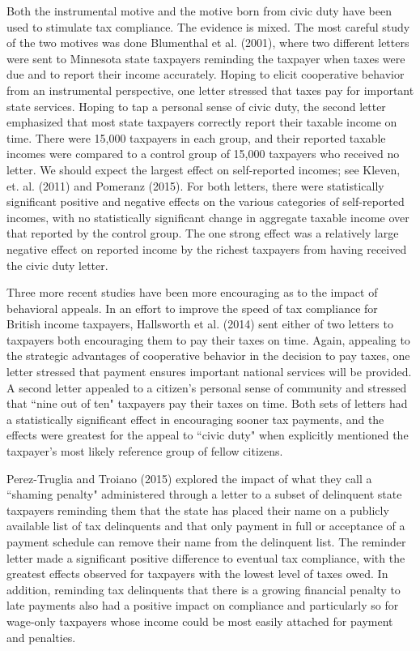 \documentclass[12pt,titlepage]{article}
\begin{document}
Both the instrumental motive and the motive born from civic duty have
been used to stimulate tax compliance.  The evidence is mixed.  The
most careful study of the two motives was done Blumenthal et
al. (2001), where two different letters were sent to Minnesota state
taxpayers reminding the taxpayer when taxes were due and to report
their income accurately.  Hoping to elicit cooperative behavior from
an instrumental perspective, one letter stressed that taxes pay for
important state services.  Hoping to tap a personal sense of civic
duty, the second letter emphasized that most state taxpayers correctly
report their taxable income on time.  There were 15,000 taxpayers in
each group, and their reported taxable incomes were compared to a
control group of 15,000 taxpayers who received no letter.  We should
expect the largest effect on self-reported incomes; see Kleven,
et. al. (2011) and Pomeranz (2015).  For both letters, there were
statistically significant positive and negative effects on the various
categories of self-reported incomes, with no statistically significant
change in aggregate taxable income over that reported by the control
group.  The one strong effect was a relatively large negative effect
on reported income by the richest taxpayers from having received the
civic duty letter.

Three more recent studies have been more encouraging as to the impact
of behavioral appeals. In an effort to improve the speed of tax
compliance for British income taxpayers, Hallsworth et al. (2014) sent
either of two letters to taxpayers both encouraging them to pay their
taxes on time.  Again, appealing to the strategic advantages of
cooperative behavior in the decision to pay taxes, one letter stressed
that payment ensures important national services will be provided.  A
second letter appealed to a citizen's personal sense of community and
stressed that ``nine out of ten" taxpayers pay their taxes on time.
Both sets of letters had a statistically significant effect in
encouraging sooner tax payments, and the effects were greatest for the
appeal to ``civic duty" when explicitly mentioned the taxpayer's most
likely reference group of fellow citizens.

Perez-Truglia and Troiano (2015) explored the impact of what they call
a ``shaming penalty" administered through a letter to a subset of
delinquent state taxpayers reminding them that the state has placed
their name on a publicly available list of tax delinquents and that
only payment in full or acceptance of a payment schedule can remove
their name from the delinquent list.  The reminder letter made a
significant positive difference to eventual tax compliance, with the
greatest effects observed for taxpayers with the lowest level of taxes
owed.  In addition, reminding tax delinquents that there is a growing
financial penalty to late payments also had a positive impact on
compliance and particularly so for wage-only taxpayers whose income
could be most easily attached for payment and penalties.
\end{document}
